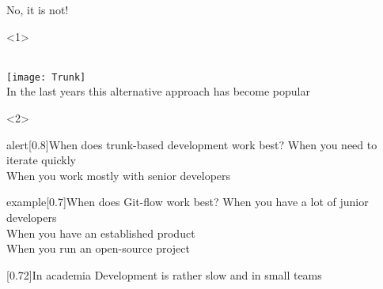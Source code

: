 \documentclass[usenames,svgnames,14pt]{beamer}
\begin{document}
\begin{frame}{No, it is not!}
    \PrepareURLsymbol[PB]
    \begin{onlyenv}<1>
        \begin{center}
            {\large{}}\\[3mm]
            \texttt{[image: Trunk]}\\[2mm]
            In the last years this alternative approach has become popular
        \end{center}
    \end{onlyenv}
    \begin{onlyenv}<2>
        \begin{varblock}{alert}[0.8\textwidth]{When does trunk-based development work best?}
            When you need to iterate quickly\\
            When you work mostly with senior developers
        \end{varblock}
        \begin{varblock}{example}[0.7\textwidth]{When does Git-flow work best?}
            When you have a lot of junior developers\\
            When you have an established product\\
            When you run an open-source project
        \end{varblock}
        \begin{varblock}{}[0.72\textwidth]{In academia}
            Development is rather slow and in small teams
        \end{varblock}
    \end{onlyenv}
\end{frame}


\end{document}
